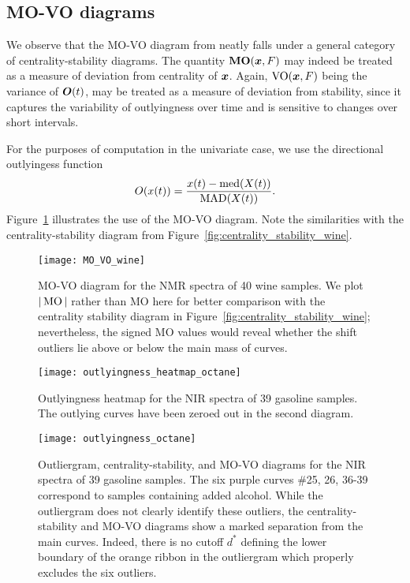 \subsection{MO-VO diagrams}

We observe that the MO-VO diagram from \textcite{dai-genton-2018} neatly falls
under a general category of centrality-stability diagrams.
The quantity $\operatorname{\textbf{MO}}(\bm{x}, F)$ may indeed be treated as a measure of deviation
from centrality of $\bm{x}$.
Again, $\operatorname{VO}(\bm{x}, F)$ being the variance of $\bm{O}(t)$, may be treated as a
measure of deviation from stability, since it captures the variability of
outlyingness over time and is sensitive to changes over short intervals.

For the purposes of computation in the univariate case, we use the directional
outlyingess function
\begin{equation}
    O(x(t)) = \frac{x(t) - \operatorname{med}(X(t))}{\operatorname{MAD}(X(t))}.
\end{equation}
Figure~\ref{fig:MO_VO_wine} illustrates the use of the MO-VO diagram.
Note the similarities with the centrality-stability diagram from
Figure~\ref{fig:centrality_stability_wine}.


\begin{figure}
    \centering
    \texttt{[image: MO\_VO\_wine]}
    \caption{
        MO-VO diagram for the NMR spectra of 40 wine samples.
        We plot $|\operatorname{MO}|$ rather than MO here for better comparison with the
        centrality stability diagram in
        Figure~\ref{fig:centrality_stability_wine}; nevertheless, the signed
        MO values would reveal whether the shift outliers lie above or below
        the main mass of curves.
    }
    \label{fig:MO_VO_wine}
\end{figure}





\begin{figure}
    \centering
    \texttt{[image: outlyingness\_heatmap\_octane]}
    \caption{
        Outlyingness heatmap for the NIR spectra of 39 gasoline samples.
        The outlying curves have been zeroed out in the second diagram.
    }
    \label{fig:outlyingness_heatmap_octane}
\end{figure}

\begin{figure}
    \centering
    \texttt{[image: outlyingness\_octane]}
    \caption{
        Outliergram, centrality-stability, and MO-VO diagrams for the NIR
        spectra of 39 gasoline samples.
        The six purple curves \#25, 26, 36-39 correspond to samples containing
        added alcohol.
        While the outliergram does not clearly identify these outliers, the
        centrality-stability and MO-VO diagrams show a marked separation from
        the main curves.
        Indeed, there is no cutoff $d^*$ defining the lower boundary of the
        orange ribbon in the outliergram which properly excludes the six
        outliers.
    }
    \label{fig:outlyingness_octane}
\end{figure}



